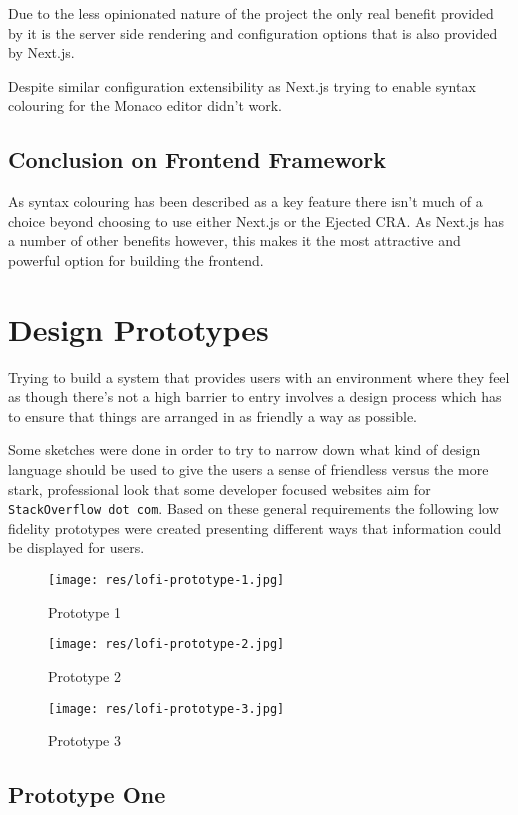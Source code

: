Due to the less opinionated nature of the project the only real benefit provided by it is the server side rendering and configuration options that is also provided by Next.js.

Despite similar configuration extensibility as Next.js trying to enable syntax colouring for the Monaco editor didn't work.

\subsection{Conclusion on Frontend Framework}

As syntax colouring has been described as a key feature there isn't much of a choice beyond choosing to use either Next.js or the Ejected CRA. As Next.js has a number of other benefits however, this makes it the most attractive and powerful option for building the frontend.

\section{Design Prototypes}

Trying to build a system that provides users with an environment where they feel as though there's not a high barrier to entry involves a design process which has to ensure that things are arranged in as friendly a way as possible.

Some sketches were done in order to try to narrow down what kind of design language should be used to give the users a sense of friendless versus the more stark, professional look that some developer focused websites aim for \texttt{StackOverflow dot com}. Based on these general requirements the following low fidelity prototypes were created presenting different ways that information could be displayed for users.

\begin{figure}[!htb]
  \texttt{[image: res/lofi-prototype-1.jpg]}
  \caption{Prototype 1}\label{fig:lofi-prototype-1}
\endminipage\hfill
{}
  \texttt{[image: res/lofi-prototype-2.jpg]}
  \caption{Prototype 2}\label{fig:lofi-prototype-2}
\endminipage\hfill
{}
  \texttt{[image: res/lofi-prototype-3.jpg]}
  \caption{Prototype 3}\label{fig:lofi-prototype-3}
\endminipage
\end{figure}

\subsection{Prototype One}

